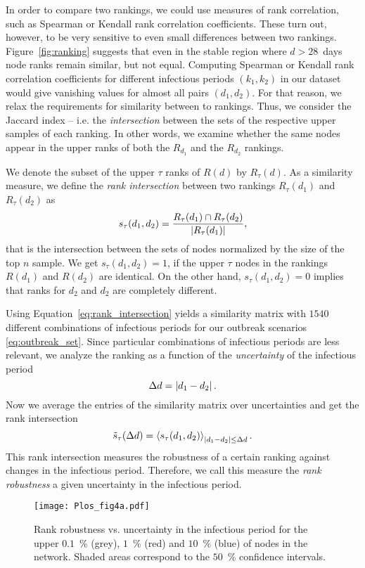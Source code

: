 In order to compare two rankings, we could use measures of rank correlation, such as Spearman or Kendall rank correlation coefficients.
These turn out, however, to be very sensitive to even small differences between two rankings.
Figure~\ref{fig:ranking} suggests that even in the stable region where $d>28$~days node ranks remain similar, but not equal.
Computing Spearman or Kendall rank correlation coefficients for different infectious periods $(k_1,k_2)$ in our dataset would give vanishing values for almost all pairs $(d_1,d_2)$.
For that reason, we relax the requirements for similarity between to rankings.
Thus, we consider the Jaccard index -- i.e. the \emph{intersection} between the sets of the respective upper samples of each ranking.
In other words, we examine whether the same nodes appear in the upper ranks of both the $R_{d_1}$ and the $R_{d_2}$ rankings.

We denote the subset of the upper $\tau $ ranks of $R(d)$ by $R_\tau (d)$.
As a similarity measure, we define the \emph{rank intersection} between two rankings $R_\tau (d_1)$ and $R_\tau (d_2)$ as
\begin{equation}\label{eq:rank_intersection}
s_\tau (d_1,d_2)=\frac{R_\tau (d_1) \cap R_\tau (d_2)}{\left| R_\tau (d_1) \right|},
\end{equation}
that is the intersection between the sets of nodes normalized by the size of the top $n$ sample.
We get $s_\tau (d_1,d_2) =1$, if the upper $\tau $ nodes in the rankings $R(d_1)$ and $R(d_2)$ are identical.
On the other hand, $s_\tau (d_1,d_2) =0$ implies that ranks for $d_2$ and $d_2$ are completely different.

Using Equation~\eqref{eq:rank_intersection} yields a similarity matrix with $1540$ different combinations of infectious periods for our outbreak scenarios \eqref{eq:outbreak_set}.
Since particular combinations of infectious periods are less relevant, we analyze the ranking as a function of the \emph{uncertainty} of the infectious period
\begin{equation}\label{eq:uncertainty_k}
\Delta d= \left| d_1-d_2 \right| .
\end{equation}
Now we average the entries of the similarity matrix over uncertainties and get the rank intersection
\begin{equation}\label{eq:robustness_k}
\tilde{s}_\tau (\Delta d)=\left< s_\tau (d_1,d_2) \right>_{\left| d_1-d_2 \right|\leq \Delta d} .
\end{equation}
This rank intersection measures the robustness of a certain ranking against changes in the infectious period.
Therefore, we call this measure the \emph{rank robustness} a given uncertainty in the infectious period.
%
\begin{SCfigure}
\texttt{[image: Plos\_fig4a.pdf]}
\caption{Rank robustness vs. uncertainty in the infectious period for the upper $0.1$~\% (grey), $1$~\% (red) and $10$~\% (blue) of nodes in the network.
Shaded areas correspond to the $50$~\% confidence intervals.}
\label{fig:plos_fig4a}
\end{SCfigure}


